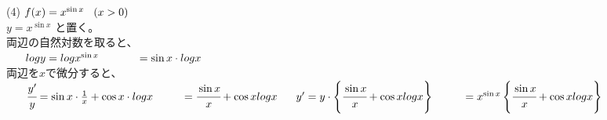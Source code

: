 \documentclass[fleqn]{jsarticle}
\begin{document}
\begin{description}
\begin{multicols}{2}
            \item[(4)]
                $ f(x) = x^{\sin{x}} \hspace{2ex} (x > 0) $ \\
                $ y = x^{\sin{x}} $ と置く。 \\
                両辺の自然対数を取ると、 \\
                $ \hspace{4ex} log{y} = log{x^{\sin{x}}} \\
                \hspace{8ex} = \sin{x} \cdot log{x} $ \\
                両辺を$x$で微分すると、 \\
                $ \hspace{4ex} \cfrac{y^{\prime}}{y} = \sin{x} \cdot \frac{1}{x} + \cos{x} \cdot log{x} \\
                \hspace{6ex} = \cfrac{\sin{x}}{x} + \cos{x}log{x} \\
                \hspace{4ex} y^{\prime} = y \cdot \left\{\cfrac{\sin{x}}{x} + \cos{x}log{x}\right\} \\
                \hspace{6ex} = x^{\sin{x}} \left\{\cfrac{\sin{x}}{x} + \cos{x}log{x}\right\} $

        \end{multicols}

    \end{description}
\end{document}
